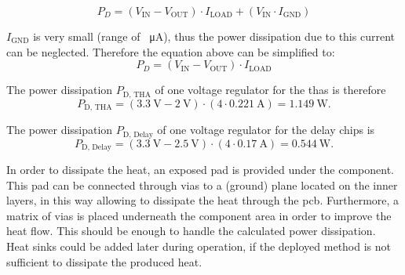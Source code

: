 \begin{equation}
	P_D = (V_\text{IN} - V_\text{OUT}) \cdot I_\text{LOAD} + (V_\text{IN} \cdot I_\text{GND})
\end{equation}

$I_\text{GND}$ is very small (range of \SI{}{\micro \ampere}), thus the power dissipation due to this current can be neglected.
Therefore the equation above can be simplified to:
\begin{equation}
	P_D = (V_\text{IN} - V_\text{OUT}) \cdot I_\text{LOAD}
\end{equation}

The power dissipation $P_\text{D, THA}$ of one voltage regulator for the \glspl{tha} is therefore
\begin{equation}
	P_\text{D, THA} = (\SI{3.3}{\volt} - \SI{2}{\volt}) \cdot (4 \cdot \SI{0.221}{\ampere}) = \SI{1.149}{\watt}.
\end{equation}

The power dissipation $P_\text{D, Delay}$ of one voltage regulator for the delay chips is 
\begin{equation}
	P_\text{D, Delay} = (\SI{3.3}{\volt} - \SI{2.5}{\volt}) \cdot (4 \cdot \SI{0.17}{\ampere}) = \SI{0.544}{\watt}.
\end{equation}

In order to dissipate the heat, an exposed pad is provided under the component.
This pad can be connected through vias to a (ground) plane located on the inner layers, in this way allowing to dissipate the heat through the \gls{pcb}.
Furthermore, a matrix of vias is placed underneath the component area in order to improve the heat flow.
This should be enough to handle the calculated power dissipation.
Heat sinks could be added later during operation, if the deployed method is not sufficient to dissipate the produced heat.

